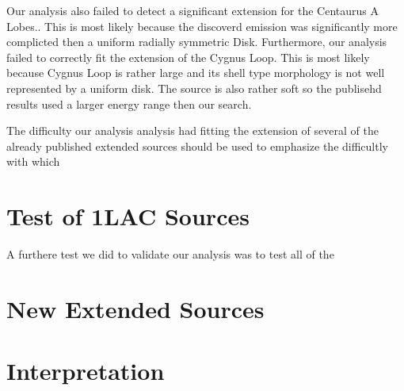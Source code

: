 \documentclass[preprint]{aastex}
\begin{document}
Our analysis also failed to detect a significant extension for the
Centaurus A Lobes.\cite{CenA paper}. This is most likely because the
discoverd emission was significantly more complicted then a uniform
radially symmetric Disk.  Furthermore, our analysis failed to correctly
fit the extension of the Cygnus Loop\cite{Cygnus Loop Paper}.  This is
most likely because Cygnus Loop is rather large and its shell type
morphology is not well represented by a uniform disk. The source is
also rather soft so the publisehd results used a larger energy range
then our search.


The difficulty our analysis analysis had fitting the extension of several
of the already published extended sources should be used to emphasize
the difficultly with which

\section{Test of 1LAC Sources}

A furthere test we did to validate our analysis was to test all of the 

\section{New Extended Sources}

\section{Interpretation}


\appendix
\end{document}
